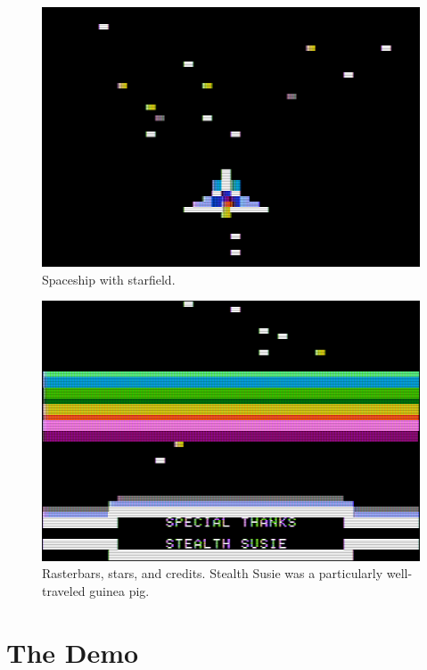 \documentclass[twocolumn]{article}
\begin{document}
\begin{figure}[tb]
\begin{center}
\includegraphics[width=\columnwidth]{figures/m7_screen3.png}
\end{center}
\caption{Spaceship with starfield.\label{fig:stars}}
\end{figure}

\begin{figure}[tb]
\begin{center}
\includegraphics[width=\columnwidth]{figures/m7_screen2.png}
\end{center}
\caption{Rasterbars, stars, and credits.  Stealth Susie was a particularly
well-traveled guinea pig.
\label{fig:credits}}
\end{figure}


\section{The Demo}
\end{document}
